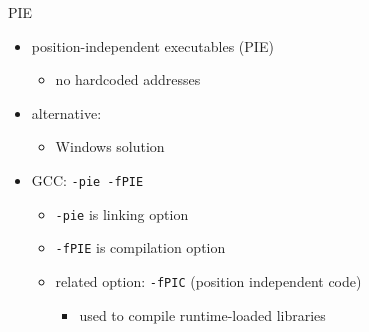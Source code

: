 
\begin{frame}{PIE}
    \begin{itemize}
    \item position-independent executables (PIE)
        \begin{itemize}
        \item no hardcoded addresses
        \end{itemize}
    \item alternative: 
        \begin{itemize}
        \item Windows solution
        \end{itemize}
    \item GCC: \texttt{-pie -fPIE}
        \begin{itemize}
        \item \texttt{-pie} is linking option
        \item \texttt{-fPIE} is compilation option
        \item related option: \texttt{-fPIC} (position independent code)
            \begin{itemize}
            \item used to compile runtime-loaded libraries
            \end{itemize}
        \end{itemize}
    \end{itemize}
\end{frame}



